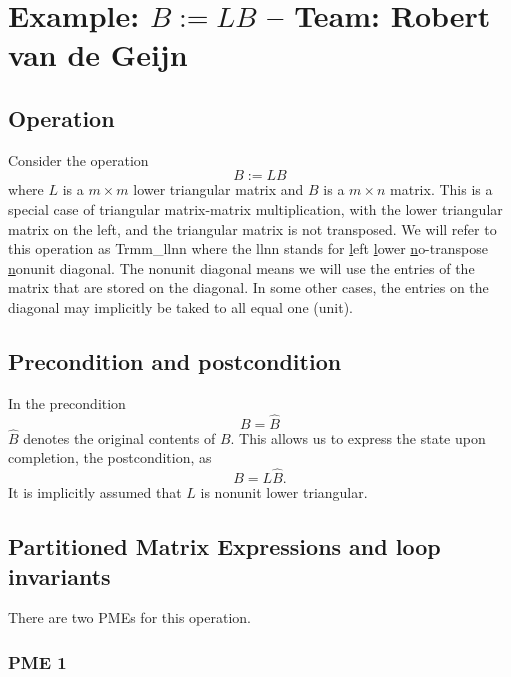\chapter{Example: $ B := L B $ --  \large Team: Robert van de Geijn}



\section{Operation}

Consider the operation
\[
B := L B 
\]
where $ L $ is a $ m \times m $ lower triangular matrix and $ B $ is a $ m \times n $ matrix.
This is a special case of triangular 
matrix-matrix multiplication, 
with the {\sc l}ower triangular matrix on the {\sc l}eft, 
and the triangular matrix is {\sc n}ot transposed.
We will refer to this operation
as {\sc Trmm\_llnn} where the {\sc llnn} stands for
\underline{l}eft
\underline{l}ower
\underline{n}o-transpose
\underline{n}onunit diagonal.
The {\sc n}onunit diagonal means we will use the entries of the matrix that are stored on the diagonal.  In some other cases, the entries on the diagonal may implicitly be taked to all equal one ({\sc u}nit).

\section{Precondition and postcondition}

In the precondition 
\[
B = \widehat B
\]
$ \widehat B $ denotes the original contents of $ B $.
This allows us to express the state upon completion, the postcondition, as
\[
B = L \widehat B.
\]
It is implicitly assumed that $ L $ is nonunit lower triangular.
\section{Partitioned Matrix Expressions and loop invariants}

There are two PMEs for this operation.

\subsection{PME 1}

